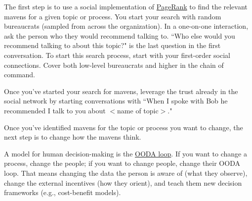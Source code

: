 The first step is to use a social implementation of \href{https://en.wikipedia.org/wiki/PageRank}{PageRank}
to find the relevant mavens for a given topic or process. You start your search with random bureaucrats (sampled from across the organization). In a one-on-one interaction, ask the person who they would recommend talking to.
``Who else would you recommend talking to about this topic?" is the last question in the first conversation.
To start this search process, start with your first-order social connections. Cover both low-level bureaucrats and higher in the chain of command.

Once you've started your search for mavens, leverage the trust already in the social network by starting conversations with ``When I spoke with Bob he recommended I talk to you about $<$name of topic$>$."


Once you've identified mavens for the topic or process you want to change, the next step is to change how the mavens think. 

A model for human decision-making is the 
\href{https://en.wikipedia.org/wiki/OODA_loop}{OODA loop}.
If you want to change a process, change the people; if you want to change people, change their OODA loop. That means changing the data the person is aware of (what they observe), change the external incentives (how they orient), and teach them new decision frameworks (e.g., cost-benefit models).



